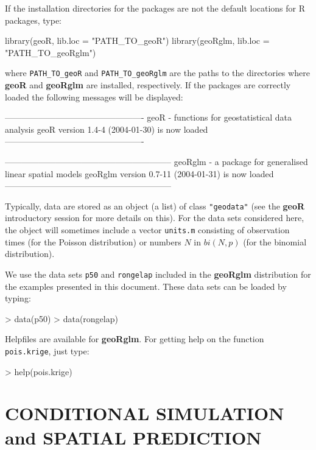 \documentclass[12pt,a4paper]{article}
\newcommand{\strong}[1]{{\textbf{ #1}}}
\let\pkg=\strong
\newcommand{\code}[1]{\texttt{\small #1}}
\newcommand{\R}{{\textsf{R}}{}}
\let\command=\code
\begin{document}
If the installation directories for the packages are not the default locations for \R{} packages, type:
\begin{Rin}
  library(geoR, lib.loc = "PATH_TO_geoR")
  library(geoRglm, lib.loc = "PATH_TO_geoRglm")
\end{Rin}
where \verb+PATH_TO_geoR+ and \verb+PATH_TO_geoRglm+ are the paths to the directories where \pkg{geoR} and \pkg{geoRglm} are installed, respectively.
If the packages are correctly loaded the following messages will be displayed:
\begin{Schunk}
\begin{Soutput}
-------------------------------------------------
geoR - functions for geostatistical data analysis
geoR version 1.4-4 (2004-01-30) is now loaded
-------------------------------------------------
\end{Soutput}
\begin{Soutput}
-----------------------------------------------------------
geoRglm - a package for generalised linear spatial models
geoRglm version 0.7-11 (2004-01-31) is now loaded
-----------------------------------------------------------
\end{Soutput}
\end{Schunk}

Typically, data are stored as an object (a list) of class \code{"geodata"} (see the \pkg{geoR} introductory session 
for more details on this). For the data sets considered here, the object will sometimes include a vector \code{units.m} consisting 
of observation times (for the Poisson distribution) or numbers $N$ in $bi(N,p)$ (for the binomial distribution).

We use the data sets  \code{p50} and \code{rongelap} included in the \pkg{geoRglm} distribution for 
the examples presented in this document. These data sets can be loaded by typing:
\begin{Schunk}
\begin{Sinput}
> data(p50)
> data(rongelap)
\end{Sinput}
\end{Schunk}
Helpfiles are available for \pkg{geoRglm}. For getting help on the function \command{pois.krige}, just type:  
\begin{Rin}
> help(pois.krige)
\end{Rin}

\section{CONDITIONAL SIMULATION and SPATIAL PREDICTION}
\end{document}
